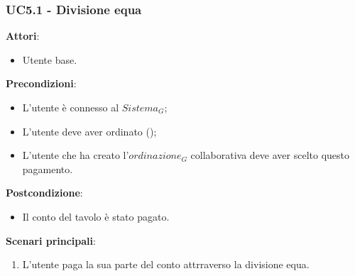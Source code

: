\subsubsection{UC5.1 - Divisione equa}\label{usecase:5.1}
\textbf{Attori}:
\begin{itemize}
    \item Utente base.
\end{itemize}
\textbf{Precondizioni}:
\begin{itemize}
    \item L'utente è connesso al $\textit{Sistema}_G$;
    \item L'utente deve aver ordinato ();
    \item L'utente che ha creato l'$\textit{ordinazione}_G$ collaborativa deve aver scelto questo pagamento.
\end{itemize}
\textbf{Postcondizione}:
\begin{itemize}
    \item Il conto del tavolo è stato pagato.
\end{itemize}
\textbf{Scenari principali}:
\begin{enumerate}
    \item L'utente paga la sua parte del conto attrraverso la divisione equa.
\end{enumerate}